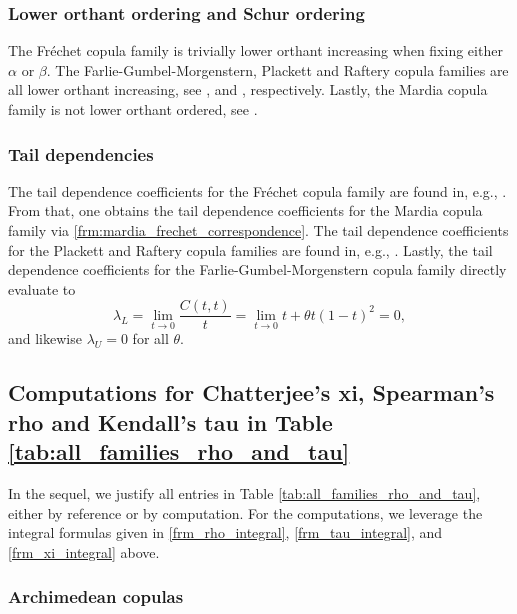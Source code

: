 \documentclass{article}
\begin{document}
\subsubsection{Lower orthant ordering and Schur ordering}\label{subsubsec:unclassified_lo_ordering}

The Fréchet copula family is trivially lower orthant increasing when fixing either $\alpha$ or $\beta$.
The Farlie-Gumbel-Morgenstern, Plackett and Raftery copula families are all lower orthant increasing, see \cite[Exercise 3.22]{Nelsen-2006}, \cite[Exercise 3.37]{Nelsen-2006} and \cite[Chapter 5.1]{Joe-1997}, respectively.
Lastly, the Mardia copula family is not lower orthant ordered, see \cite[Example 2.8]{pfeifer2004modeling}.

\subsubsection{Tail dependencies}\label{subsubsec:unclassified_tail_dependencies}

The tail dependence coefficients for the Fréchet copula family are found in, e.g., \cite[Exercise 2.4]{Nelsen-2006}.
From that, one obtains the tail dependence coefficients for the Mardia copula family via \eqref{frm:mardia_frechet_correspondence}.
The tail dependence coefficients for the Plackett and Raftery copula families are found in, e.g., \cite[Exercise 5.21]{Nelsen-2006}.
Lastly, the tail dependence coefficients for the Farlie-Gumbel-Morgenstern copula family directly evaluate to 
\[
    \lambda_L
    = \lim_{t\rightarrow 0} \frac{C(t,t)}{t}
    = \lim_{t\rightarrow 0} t + \theta t (1-t)^2
    = 0
,\]
and likewise $\lambda_U = 0$ for all $\theta$.

\subsection{Computations for Chatterjee's xi, Spearman's rho and Kendall's tau in Table \ref{tab:all_families_rho_and_tau}}
\label{subsec:computations_for_xi_rho_and_tau}

In the sequel, we justify all entries in Table \ref{tab:all_families_rho_and_tau}, either by reference or by computation.
For the computations, we leverage the integral formulas given in  \eqref{frm_rho_integral}, \eqref{frm_tau_integral}, and \eqref{frm_xi_integral} above.

\subsubsection{Archimedean copulas}
\label{subsubsec:archimedean_spearman_and_kendall}
\end{document}
